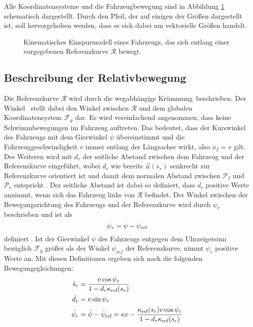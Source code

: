 Alle Koordinatensysteme und die Fahrzeugbewegung sind in Abbildung \ref{fig:Fahrzeugmodell} schematisch dargestellt. Durch den Pfeil, der auf einigen der Größen dargestellt ist, soll hervorgehoben werden, dass es sich dabei um vektorielle Größen handelt. 
\begin{figure}[h]
	\centering
	\fontsize{24pt}{16pt}\selectfont
	\caption{Kinematisches Einspurmodell eines Fahrzeugs, das sich entlang einer vorgegebenen Referenzkurve $\mathcal{R}$ bewegt. }
	\label{fig:Fahrzeugmodell}
\end{figure}

\subsection{Beschreibung der Relativbewegung}\label{subsec:Relativbewegung}
Die Referenzkurve $\mathcal{R}$ wird durch die wegabhängige Krümmung \kapparefofs\,beschrieben. Der Winkel \psiref\, stellt dabei den Winkel zwischen $\mathcal{R}$ und dem globalen Koordinatensystem $\mathcal{F}_g$ dar. Es wird vereinfachend angenommen, dass keine Schwimmbewegungen im Fahrzeug auftreten. Das bedeutet, dass der Kurswinkel des Fahrzeugs mit dem Gierwinkel $\psi$ übereinstimmt und die Fahrzeuggeschwindigkeit $v$ immer entlang der Längsachse wirkt, also $\dot{x}_f = v$ gilt. Des Weiteren wird mit $d_r$ der seitliche Abstand zwischen dem Fahrzeug und der Referenzkurve eingeführt, wobei $d_r$ wie bereits $\vec{\textrm{n}}(s_r)$ senkrecht zur Referenzkurve orientiert ist und damit dem normalen Abstand zwischen $\mathcal{P}_f$ und $\mathcal{P}_r$ entspricht \cite{Rathgeber.2016}. Der seitliche Abstand ist dabei so definiert, dass $d_r$ positive Werte annimmt, wenn sich das Fahrzeug links von $\mathcal{R}$ befindet. Der Winkel zwischen der Bewegungsrichtung des Fahrzeugs und der Referenzkurve wird durch $\psi_r$ beschrieben und ist als \begin{equation}
	\psi_r = \psi - \psi_{\textrm{ref}}
\end{equation}
definiert \cite{Rathgeber.2016}. Ist der Gierwinkel $\psi$ des Fahrzeugs entgegen dem Uhrzeigersinn bezüglich $\mathcal{F}_g$ größer als der Winkel $\psi_{ref}$ der Referenzkurve, nimmt $\psi_r$ positive Werte an. Mit diesen Definitionen ergeben sich nach \cite{Rathgeber.2016} die folgenden Bewegungsgleichungen:
\begin{align}
	\dot{s}_r &= \frac{v\cos{\psi_r}}{1-d_r\kappa_{\textrm{ref}}(s_r)} \label{eq:dsr} \\
	\dot{d}_r &= v\sin{\psi_r} \label{eq:ddr} \\
	\dot{\psi_r} &= \dot{\psi} -\dot{\psi}_\textrm{ref} = \kappa v - \frac{\kappa_{\textrm{ref}}(s_r) v\cos{\psi_r}}{1-d_r\kappa_{\textrm{ref}}(s_r)} \label{eq:dpsir}
\end{align}

